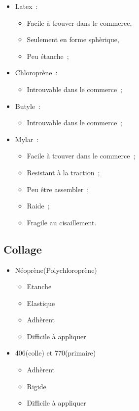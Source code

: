 \documentclass{beamer}
\begin{document}
\begin{frame}
  \begin{multicols}{2}
    \begin{itemize}
      \item Latex~:
      \begin{itemize}
        \item Facile à trouver dans le commerce,
        \item Seulement en forme sphèrique,
        \item Peu étanche~;
      \end{itemize}
      \item Chloroprène~:
      \begin{itemize}
        \item Introuvable dans le commerce~;
      \end{itemize}
      \item Butyle~:
      \begin{itemize}
        \item Introuvable dans le commerce~;
      \end{itemize}
    \end{itemize}
    \newpage
    \begin{itemize}
      \item Mylar~:
      \begin{itemize}
        \item Facile à trouver dans le commerce~;
        \item Resistant à la traction~;
        \item Peu être assembler~;
        \item Raide~;
        \item Fragile au cisaillement.
      \end{itemize}
    \end{itemize}
  \end{multicols}
\end{frame}

\subsection{Collage}

\begin{frame}
  \begin{itemize}
    \item Néoprène(Polychloroprène)
    \begin{itemize}
      \item Etanche
      \item Elastique
      \item Adhèrent
      \item Difficile à appliquer
    \end{itemize}
    \item 406(colle) et 770(primaire)
    \begin{itemize}
      \item Adhèrent
      \item Rigide
      \item Difficile à appliquer
    \end{itemize}
  \end{itemize}
\end{frame}
\end{document}
